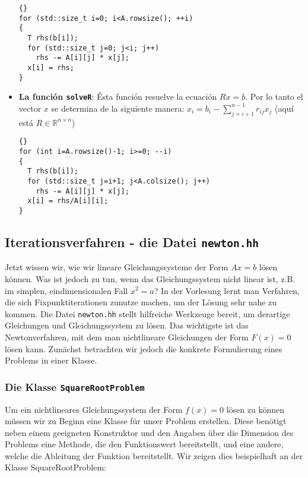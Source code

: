 \documentclass[a4paper,11pt]{article}
\theoremstyle{definition}
\begin{document}
\begin{itemize}
{\footnotesize{\begin{lstlisting}{}
for (std::size_t i=0; i<A.rowsize(); ++i)
{
  T rhs(b[i]);
  for (std::size_t j=0; j<i; j++)
    rhs -= A[i][j] * x[j];
  x[i] = rhs;
}
\end{lstlisting}}}

\item \textbf{La función \lstinline{solveR}}: 
  Ésta función resuelve la ecuación $Rx=b$. 
  Por lo tanto el vector $x$ se determina de la siguiente manera:
  $x_i= b_i - \sum_{j=i+1}^{n-1}r_{ij}x_j$ (aquí está
  $R \in \mathbb{R}^{n \times n}$)

{\footnotesize{\begin{lstlisting}{}
for (int i=A.rowsize()-1; i>=0; --i)
{
  T rhs(b[i]);
  for (std::size_t j=i+1; j<A.colsize(); j++)
    rhs -= A[i][j] * x[j];
  x[i] = rhs/A[i][i];
}
\end{lstlisting}}}

\end{itemize}



\subsection{Iterationsverfahren - die Datei \lstinline{newton.hh}}

Jetzt wissen wir, wie wir lineare Gleichungssysteme der Form $Ax = b$
lösen können. Was ist jedoch zu tun, wenn das Gleichungssystem nicht
linear ist, z.B. im simplen, eindimensionalen Fall $x^2 = a$? In der
Vorlesung lernt man Verfahren, die sich Fixpunktiterationen zunutze
machen, um der Lösung sehr nahe zu kommen. Die Datei
\lstinline{newton.hh} stellt hilfreiche Werkzeuge bereit, um derartige
Gleichungen und Gleichungssystem zu lösen. Das wichtigste ist das
Newtonverfahren, mit dem man nichtlineare Gleichungen der Form
$F(x) = 0$ lösen kann. Zunächst betrachten wir jedoch die konkrete
Formulierung eines Problems in einer Klasse.



\subsubsection{Die Klasse \lstinline{SquareRootProblem}}
Um ein nichtlineares Gleichungssystem der Form $f(x)=0$ lösen zu
können müssen wir zu Beginn eine Klasse für unser Problem
erstellen. Diese benötigt neben einem geeigneten Konstruktor und den
Angaben über die Dimension des Problems eine Methode, die den
Funktionswert bereitstellt, und eine andere, welche die Ableitung der
Funktion bereitstellt.  Wir zeigen dies beispielhaft an der Klasse
SquareRootProblem:
\end{document}
